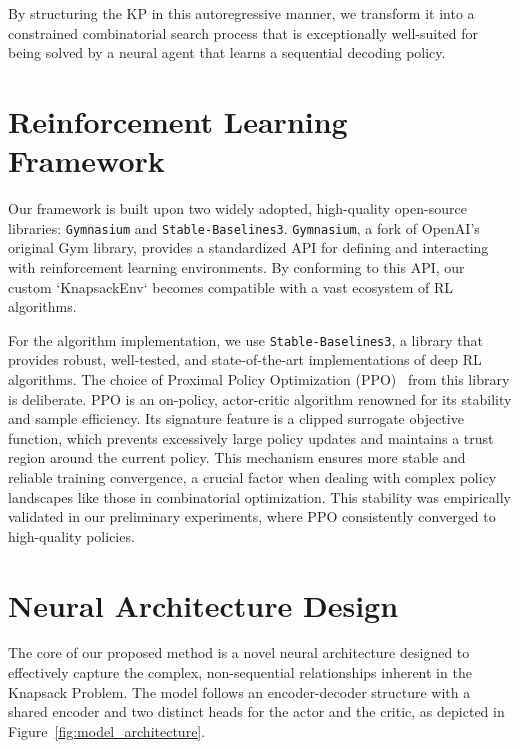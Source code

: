 By structuring the KP in this autoregressive manner, we transform it into a constrained combinatorial search process that is exceptionally well-suited for being solved by a neural agent that learns a sequential decoding policy.

\section{Reinforcement Learning Framework}
Our framework is built upon two widely adopted, high-quality open-source libraries: \texttt{Gymnasium} and \texttt{Stable-Baselines3}. \texttt{Gymnasium}, a fork of OpenAI's original Gym library, provides a standardized API for defining and interacting with reinforcement learning environments. By conforming to this API, our custom `KnapsackEnv` becomes compatible with a vast ecosystem of RL algorithms.

For the algorithm implementation, we use \texttt{Stable-Baselines3}, a library that provides robust, well-tested, and state-of-the-art implementations of deep RL algorithms. The choice of Proximal Policy Optimization (PPO)~\cite{schulmanProximalPolicyOptimization2017} from this library is deliberate. PPO is an on-policy, actor-critic algorithm renowned for its stability and sample efficiency. Its signature feature is a clipped surrogate objective function, which prevents excessively large policy updates and maintains a trust region around the current policy. This mechanism ensures more stable and reliable training convergence, a crucial factor when dealing with complex policy landscapes like those in combinatorial optimization. This stability was empirically validated in our preliminary experiments, where PPO consistently converged to high-quality policies.

\section{Neural Architecture Design}
The core of our proposed method is a novel neural architecture designed to effectively capture the complex, non-sequential relationships inherent in the Knapsack Problem. The model follows an encoder-decoder structure with a shared encoder and two distinct heads for the actor and the critic, as depicted in Figure~\ref{fig:model_architecture}.

